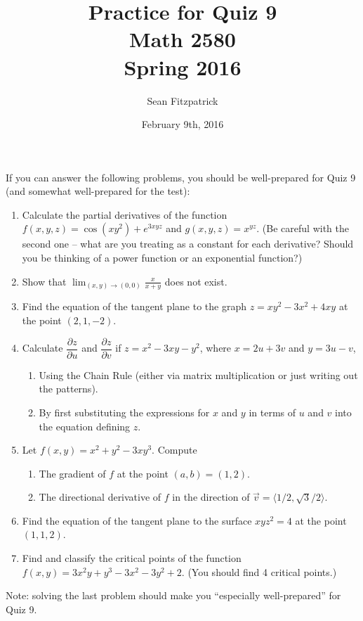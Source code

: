 \documentclass[letterpaper,12pt]{article}
\title{Practice for Quiz 9\\Math 2580\\Spring 2016}
\author{Sean Fitzpatrick}
\date{February 9th, 2016}
\newcommand{\pd}[2]{\dfrac{\partial #1}{\partial #2}}
\begin{document}
 \maketitle

If you can answer the following problems, you should be well-prepared for Quiz 9 (and somewhat well-prepared for the test):



\begin{enumerate}
 \item Calculate the partial derivatives of the function $f(x,y,z) = \cos(xy^2)+e^{3xyz}$ and $g(x,y,z) = x^{yz}$. (Be careful with the second one -- what are you treating as a constant for each derivative? Should you be thinking of a power function or an exponential function?)
 \item Show that $\displaystyle \lim_{(x,y)\to (0,0)}\frac{x}{x+y}$ does not exist.
 \item Find the equation of the tangent plane to the graph $z=xy^2-3x^2+4xy$ at the point $(2,1,-2)$.
 \item Calculate $\pd{z}{u}$ and $\pd{z}{v}$ if $z=x^2-3xy-y^2$, where $x=2u+3v$ and $y=3u-v$,
\begin{enumerate}
 \item Using the Chain Rule (either via matrix multiplication or just writing out the patterns).
 \item By first substituting the expressions for $x$ and $y$ in terms of $u$ and $v$ into the equation defining $z$.
\end{enumerate}
 \item Let $f(x,y)=x^2+y^2-3xy^3$. Compute
\begin{enumerate}
 \item The gradient of $f$ at the point $(a,b)=(1,2)$.
 \item The directional derivative of $f$ in the direction of $\vec{v} = \langle 1/2, \sqrt{3}/2\rangle$.
\end{enumerate}
 \item Find the equation of the tangent plane to the surface $xyz^2=4$ at the point $(1,1,2)$.
 \item Find and classify the critical points of the function $f(x,y) = 3x^2y+y^3-3x^2-3y^2+2$. (You should find 4 critical points.)
\end{enumerate}

\bigskip

\noindent Note: solving the last problem should make you ``especially well-prepared'' for Quiz 9.
\end{document}
